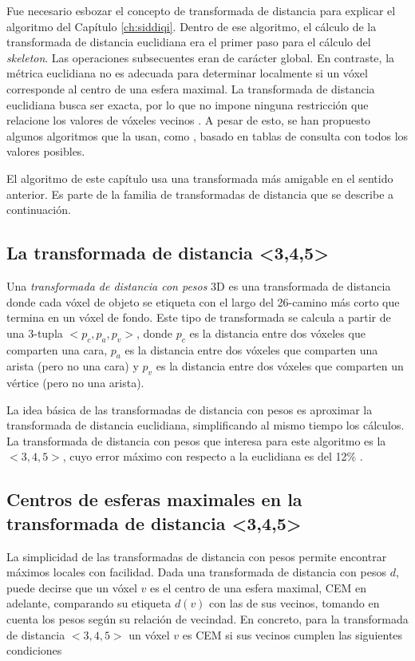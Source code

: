 Fue necesario esbozar el concepto de transformada de distancia para explicar el algoritmo del Capítulo \ref{ch:siddiqi}. Dentro de ese algoritmo, el cálculo de la transformada de distancia euclidiana era el primer paso para el cálculo del \textit{skeleton}. Las operaciones subsecuentes eran de carácter global. En contraste, la métrica euclidiana no es adecuada para determinar localmente si un vóxel corresponde al centro de una esfera maximal. La transformada de distancia euclidiana busca ser exacta, por lo que no impone ninguna restricción que relacione los valores de vóxeles vecinos \cite{borgefors1991euclidean}. A pesar de esto, se han propuesto algunos algoritmos que la usan, como \cite{remy2003look}, basado en tablas de consulta con todos los valores posibles.

El algoritmo de este capítulo usa una transformada más amigable en el sentido anterior. Es parte de la familia de transformadas de distancia que se describe a continuación.

\subsection{La transformada de distancia <3,4,5>}

Una \textit{transformada de distancia con pesos} 3D es una transformada de distancia donde cada vóxel de objeto se etiqueta con el largo del 26-camino más corto que termina en un vóxel de fondo. Este tipo de transformada se calcula a partir de una 3-tupla $<p_c,p_a,p_v>$, donde $p_c$ es la distancia entre dos vóxeles que comparten una cara, $p_a$ es la distancia entre dos vóxeles que comparten una arista (pero no una cara) y $p_v$ es la distancia entre dos vóxeles que comparten un vértice (pero no una arista).

La idea básica de las transformadas de distancia con pesos es aproximar la transformada de distancia euclidiana, simplificando al mismo tiempo los cálculos. La transformada de distancia con pesos que interesa para este algoritmo es la $<3,4,5>$, cuyo error máximo con respecto a la euclidiana es del 12\% \cite{borgefors1996digital}.

\subsection{Centros de esferas maximales en la transformada de distancia <3,4,5>}
\label{ssec:hr_cmb}

La simplicidad de las transformadas de distancia con pesos permite encontrar máximos locales con facilidad. Dada una transformada de distancia con pesos $d$, puede decirse que un vóxel $v$ es el centro de una esfera maximal, CEM en adelante, comparando su etiqueta $d(v)$ con las de sus vecinos, tomando en cuenta los pesos según su relación de vecindad. En concreto, para la transformada de distancia $<3,4,5>$ un vóxel $v$ es CEM si sus vecinos cumplen las siguientes condiciones

